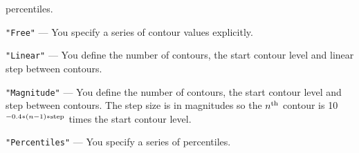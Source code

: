 \documentclass[twoside,11pt,nolof]{starlink}
\begin{document}
{{{\begin{description}
                          percentiles.
         \item \texttt{"Free"} --- You specify a series of contour values
                        explicitly.
         \item \texttt{"Linear"} --- You define the number of contours, the start
                        contour level and linear step between contours.
         \item \texttt{"Magnitude"} --- You define the number of contours, the start
                        contour level and step between contours.  The
                        step size is in magnitudes so the $n^{\rm th}$
                        contour is 10$^{-0.4*(n-1)*{\rm step}}$ times the
                        start contour level.
         \item \texttt{"Percentiles"} --- You specify a series of percentiles.
         \end{description}

}}}
\end{document}
